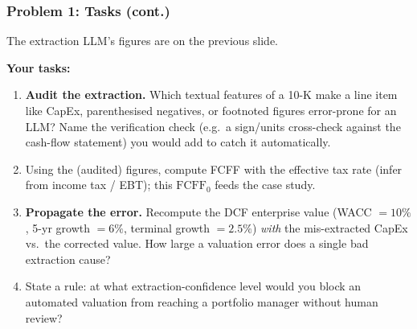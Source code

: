 \documentclass[9pt,t]{beamer}
\begin{document}
\begin{frame}
\frametitle{Problem 1: Tasks (cont.)}

The extraction LLM's figures are on the previous slide.

\medskip
\textbf{Your tasks:}
\begin{enumerate}
  \item \textbf{Audit the extraction.} Which textual features of a 10-K make a line
        item like CapEx, parenthesised negatives, or footnoted figures error-prone for
        an LLM? Name the verification check (e.g.\ a sign/units cross-check against the
        cash-flow statement) you would add to catch it automatically.
  \item Using the (audited) figures, compute FCFF with the effective tax rate
        (infer from income tax / EBT); this $\text{FCFF}_0$ feeds the case study.
  \item \textbf{Propagate the error.} Recompute the DCF enterprise value
        (WACC $=10\%$, 5-yr growth $=6\%$, terminal growth $=2.5\%$) \emph{with} the
        mis-extracted CapEx vs.\ the corrected value. How large a valuation error does a
        single bad extraction cause?
  \item State a rule: at what extraction-confidence level would you block an automated
        valuation from reaching a portfolio manager without human review?
\end{enumerate}
\end{frame}
\end{document}

